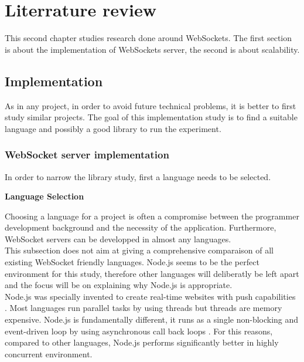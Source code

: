\chapter{Literrature review} 
\label{Chapter2} 

This second chapter studies research done around WebSockets. The first
section is about the implementation of WebSockets server, the second is about
scalability. \\

\section{Implementation}

As in any project, in order to avoid future technical problems, it is better to
first study similar projects. The goal of this implementation study is to find a
suitable language and possibly a good library to run the experiment.

\subsection{WebSocket server implementation}

In order to narrow the library study, first a language needs to be selected.

\textbf{Language Selection}

Choosing a language for a project is often a compromise between the programmer
development background and the necessity of the application. Furthermore,
WebSocket servers can be developped in almost any languages.\\

This subsection does not aim at giving a comprehensive comparaison of all
existing WebSocket friendly languages. Node.js seems to be the perfect
environment for this study, therefore other languages will deliberatly be left
apart and the focus will be on explaining why Node.js is appropriate.\\

Node.js was specially invented to create real-time websites with push
capabilities \citep{Reference35}. Most languages run parallel tasks by using
threads but threads are memory expensive. Node.js is fundamentally different,
it runs as a single non-blocking and event-driven loop by using asynchronous
call back loops \citep{Reference37}. For this reasons, compared to other
languages, Node.js performs significantly better in highly concurrent
environment.\\

